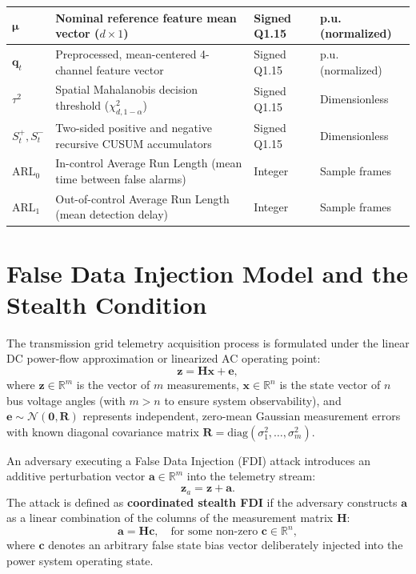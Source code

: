 \documentclass[12pt,a4paper]{report}
\begin{document}
\begin{table}[H]
\begin{tabular}{|p{2.2cm}|p{7.2cm}|p{2.6cm}|p{2.2cm}|}
\hline
$\boldsymbol{\mu}$ & Nominal reference feature mean vector ($d \times 1$) & Signed Q1.15 & p.u. (normalized) \\
\hline
$\boldsymbol{q}_t$ & Preprocessed, mean-centered 4-channel feature vector & Signed Q1.15 & p.u. (normalized) \\
\hline
$\tau^2$ & Spatial Mahalanobis decision threshold ($\chi^2_{d, 1-\alpha}$) & Signed Q1.15 & Dimensionless \\
\hline
$S_t^+, S_t^-$ & Two-sided positive and negative recursive CUSUM accumulators & Signed Q1.15 & Dimensionless \\
\hline
$\text{ARL}_0$ & In-control Average Run Length (mean time between false alarms)& Integer & Sample frames \\
\hline
$\text{ARL}_1$ & Out-of-control Average Run Length (mean detection delay) & Integer & Sample frames \\
\hline
\end{tabular}
\end{table}

\section{False Data Injection Model and the Stealth Condition}
The transmission grid telemetry acquisition process is formulated under the linear DC
power-flow approximation or linearized AC operating point:
\begin{equation}
\boldsymbol{z} = \boldsymbol{H}\boldsymbol{x} + \boldsymbol{e},
\label{eq:ch3_dc_model}
\end{equation}
where $\boldsymbol{z} \in \mathbb{R}^m$ is the vector of $m$ measurements, $\boldsymbol{x} \in \mathbb{R}^n$
is the state vector of $n$ bus voltage angles (with $m > n$ to ensure system observability),
and $\boldsymbol{e} \sim \mathcal{N}(\boldsymbol{0}, \boldsymbol{R})$ represents independent,
zero-mean Gaussian measurement errors with known diagonal covariance matrix
$\boldsymbol{R} = \text{diag}(\sigma_1^2, \dots, \sigma_m^2)$.

An adversary executing a False Data Injection (FDI) attack introduces an additive
perturbation vector $\boldsymbol{a} \in \mathbb{R}^m$ into the telemetry stream:
\begin{equation}
\boldsymbol{z}_a = \boldsymbol{z} + \boldsymbol{a}.
\label{eq:ch3_attack_stream}
\end{equation}
The attack is defined as \textbf{coordinated stealth FDI} if the adversary constructs
$\boldsymbol{a}$ as a linear combination of the columns of the measurement matrix $\boldsymbol{H}$:
\begin{equation}
\boldsymbol{a} = \boldsymbol{H}\boldsymbol{c}, \quad \text{for some non-zero } \boldsymbol{c} \in \mathbb{R}^n,
\label{eq:ch3_stealth_definition}
\end{equation}
where $\boldsymbol{c}$ denotes an arbitrary false state bias vector deliberately injected
into the power system operating state.
\end{document}
